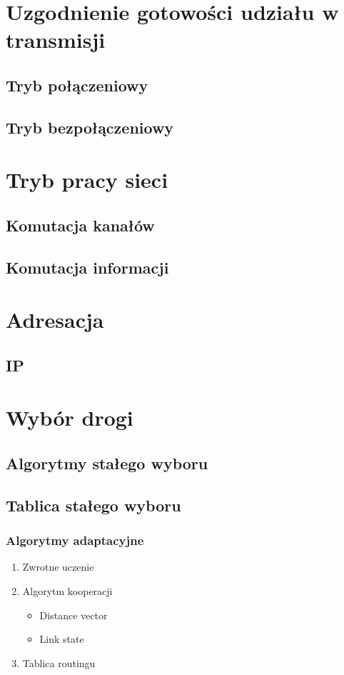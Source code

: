 \documentclass[a4paper,twoside]{article}
\begin{document}
\section{Uzgodnienie gotowości udziału w transmisji}
	\subsection{Tryb połączeniowy}
	\subsection{Tryb bezpołączeniowy}
\section{Tryb pracy sieci}
	\subsection{Komutacja kanałów}
	\subsection{Komutacja informacji}
\section{Adresacja}
	\subsection{IP}
\section{Wybór drogi}
	\subsection{Algorytmy stałego wyboru}
	\subsection{Tablica stałego wyboru}
		\subsubsection{Algorytmy adaptacyjne}
		\begin{enumerate}
			\item Zwrotne uczenie
			\item Algorytm kooperacji
			\begin{itemize}
				\item Distance vector
				\item Link state
			\end{itemize}
			\item Tablica routingu
		\end{enumerate}
		
\end{document}
